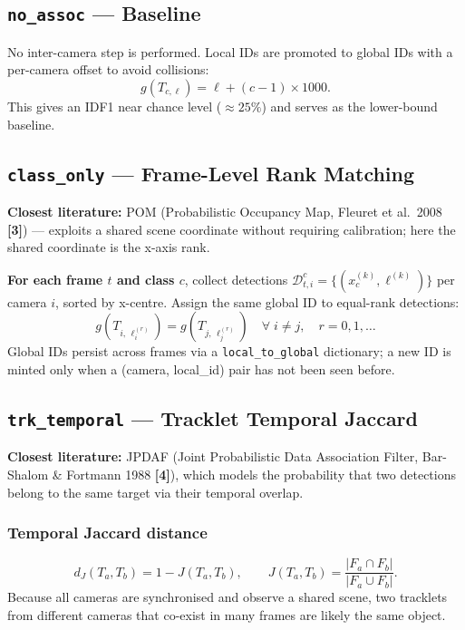 \documentclass[11pt,a4paper]{article}
\newcommand{\code}[1]{\texttt{\small#1}}
\newcommand{\lit}[1]{\textbf{\small[#1]}}
\begin{document}
\subsection{\texttt{no\_assoc} — Baseline}

No inter-camera step is performed.  Local IDs are promoted to global IDs with
a per-camera offset to avoid collisions:
\begin{equation}
  g(T_{c,\ell}) = \ell + (c-1) \times 1000.
\end{equation}
This gives an IDF1 near chance level ($\approx 25\%$) and serves as the
lower-bound baseline.

\subsection{\texttt{class\_only} — Frame-Level Rank Matching}

\textbf{Closest literature:} POM (Probabilistic Occupancy Map,
Fleuret et al.\ 2008 \lit{3}) — exploits a shared scene coordinate without
requiring calibration; here the shared coordinate is the x-axis rank.

\textbf{For each frame $t$ and class $c$}, collect detections
$\mathcal{D}^c_{t,i} = \{(x^{(k)}_c, \ell^{(k)})\}$ per camera $i$,
sorted by x-centre.  Assign the same global ID to equal-rank detections:
\begin{equation}
  g\!\left(T_{i,\,\ell^{(r)}_i}\right) = g\!\left(T_{j,\,\ell^{(r)}_j}\right)
  \quad \forall\; i \ne j, \quad r = 0,1,\ldots
\end{equation}
Global IDs persist across frames via a \code{local\_to\_global} dictionary;
a new ID is minted only when a (camera, local\_id) pair has not been seen before.

\subsection{\texttt{trk\_temporal} — Tracklet Temporal Jaccard}

\textbf{Closest literature:} JPDAF (Joint Probabilistic Data Association
Filter, Bar-Shalom \& Fortmann 1988 \lit{4}), which models the probability
that two detections belong to the same target via their temporal overlap.

\subsubsection*{Temporal Jaccard distance}
\begin{equation}
  d_J(T_a, T_b) = 1 - J(T_a, T_b), \qquad
  J(T_a, T_b) = \frac{|F_a \cap F_b|}{|F_a \cup F_b|}.
  \label{eq:jaccard}
\end{equation}
Because all cameras are synchronised and observe a shared scene, two tracklets
from different cameras that co-exist in many frames are likely the same object.
\end{document}

